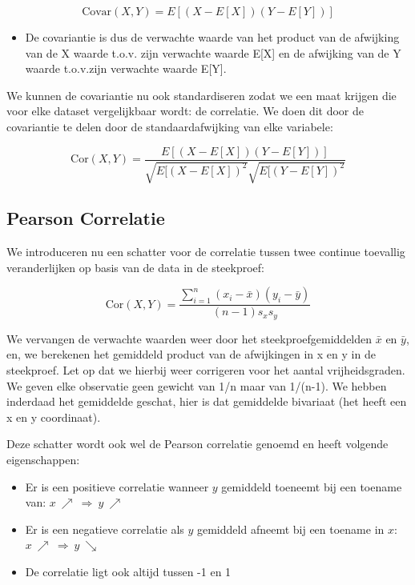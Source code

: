 \documentclass[
  12pt,dutch,coursenotes]{book}
\providecommand{\tightlist}{%
  \setlength{\itemsep}{0pt}\setlength{\parskip}{0pt}}
\begin{document}
\[\mbox{Covar}(X,Y)=E[(X-E[X])(Y-E[Y])]\]

\begin{itemize}
\tightlist
\item
  De covariantie is dus de verwachte waarde van het product van de afwijking van de X waarde t.o.v. zijn verwachte waarde E{[}X{]} en de afwijking van de Y waarde t.o.v.zijn verwachte waarde E{[}Y{]}.
\end{itemize}

We kunnen de covariantie nu ook standardiseren zodat we een maat krijgen die voor elke dataset vergelijkbaar wordt: de correlatie. We doen dit door de covariantie te delen door de standaardafwijking van elke variabele:

\[\mbox{Cor}(X,Y)=\frac{E[(X-E[X])(Y-E[Y])]}{\sqrt{E[(X-E[X])^2}\sqrt{E[(Y-E[Y])^2}}\]

\hypertarget{pearson-correlatie}{%
\subsection{Pearson Correlatie}\label{pearson-correlatie}}

We introduceren nu een schatter voor de correlatie tussen twee continue toevallig veranderlijken op basis van de data in de steekproef:

\[
\mbox{Cor}(X,Y)=\frac{\sum_{i=1}^{n}(x_{i}-\bar{x})(y_{i}-\bar{y})}{(n-1)s_{x}s_{y}}
\]

We vervangen de verwachte waarden weer door het steekproefgemiddelden \(\bar x\) en \(\bar y\), en, we berekenen het gemiddeld product van de afwijkingen in x en y in de steekproef. Let op dat we hierbij weer corrigeren voor het aantal vrijheidsgraden. We geven elke observatie geen gewicht van 1/n maar van 1/(n-1). We hebben inderdaad het gemiddelde geschat, hier is dat gemiddelde bivariaat (het heeft een x en y coordinaat).

Deze schatter wordt ook wel de Pearson correlatie genoemd en heeft volgende eigenschappen:

\begin{itemize}
\item
  Er is een positieve correlatie wanneer \(y\) gemiddeld toeneemt bij een toename van: \(x \ \nearrow \ \Rightarrow \ y \ \nearrow\)
\item
  Er is een negatieve correlatie als \(y\) gemiddeld afneemt bij een toename in \(x\): \(x \ \nearrow \ \Rightarrow \ y \ \searrow\)
\item
  De correlatie ligt ook altijd tussen -1 en 1
\end{itemize}
\end{document}
